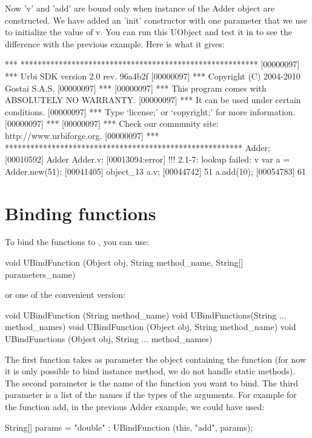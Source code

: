 Now 'v' and 'add' are bound only when instance of the Adder object are
constructed. We have added an 'init' constructor with one parameter that
we use to initialize the value of v. You can run this UObject and test
it in \urbi to see the difference with the previous example. Here is what
it gives:

\begin{urbiunchecked}
[00000097] *** ********************************************************
[00000097] *** Urbi SDK version 2.0 rev. 96a4b2f
[00000097] *** Copyright (C) 2004-2010 Gostai S.A.S.
[00000097] ***
[00000097] *** This program comes with ABSOLUTELY NO WARRANTY.
[00000097] *** It can be used under certain conditions.
[00000097] *** Type `license;' or `copyright;' for more information.
[00000097] ***
[00000097] *** Check our community site: http://www.urbiforge.org.
[00000097] *** ********************************************************
Adder;
[00010592] Adder
Adder.v;
[00013094:error] !!! 2.1-7: lookup failed: v
var a = Adder.new(51);
[00041405] object_13
a.v;
[00044742] 51
a.add(10);
[00054783] 61
\end{urbiunchecked}


\section{Binding functions}
\label{sec:uob:apijava:func}

To bind the functions to \urbi, you can use:
\begin{java}
void UBindFunction (Object obj, String method_name, String[] parameters_name)
\end{java}
or one of the convenient version:
\begin{java}
void UBindFunction (String method_name)
void UBindFunctions(String ... method_names)
void UBindFunction (Object obj, String method_name)
void UBindFunctions (Object obj, String ... method_names)
\end{java}

The first function takes as parameter the object containing the function
(for now it is only possible to bind instance method, we do not handle static
methods). The second parameter is the name of the function you want to bind.
The third parameter is a list of the names if the types of the arguments.
For example for the function add, in the previous Adder example, we could have
used:

\begin{java}
String[] params = { "double" };
UBindFunction (this, "add", params);
\end{java}

